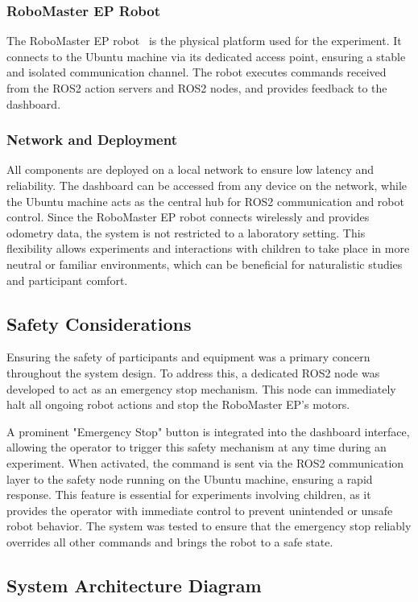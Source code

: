 \documentclass[a4paper]{usiinfbachelorproject}
\begin{document}
\subsubsection*{\textbf{RoboMaster EP Robot}}
The RoboMaster EP robot~\cite{djirobomasterep} is the physical platform used for the experiment.
It connects to the Ubuntu machine via its dedicated access point, ensuring a stable and isolated communication channel.
The robot executes commands received from the ROS2 action servers and ROS2 nodes, and provides feedback to the dashboard.


\subsubsection*{\textbf{Network and Deployment}}
All components are deployed on a local network to ensure low latency and reliability.
The dashboard can be accessed from any device on the network, while the Ubuntu machine acts as the central hub for ROS2 communication and robot control.
Since the RoboMaster EP robot connects wirelessly and provides odometry data, the system is not restricted to a laboratory setting.
This flexibility allows experiments and interactions with children to take place in more neutral or familiar environments, which can be beneficial for naturalistic studies and participant comfort.

\subsection{\textbf{Safety Considerations}}
Ensuring the safety of participants and equipment was a primary concern throughout the system design.
To address this, a dedicated ROS2 node was developed to act as an emergency stop mechanism.
This node can immediately halt all ongoing robot actions and stop the RoboMaster EP's motors.

A prominent "Emergency Stop" button is integrated into the dashboard interface, allowing the operator to trigger this safety mechanism at any time during an experiment.
When activated, the command is sent via the ROS2 communication layer to the safety node running on the Ubuntu machine, ensuring a rapid response.
This feature is essential for experiments involving children, as it provides the operator with immediate control to prevent unintended or unsafe robot behavior.
The system was tested to ensure that the emergency stop reliably overrides all other commands and brings the robot to a safe state.

\subsection{\textbf{System Architecture Diagram}}
\end{document}
